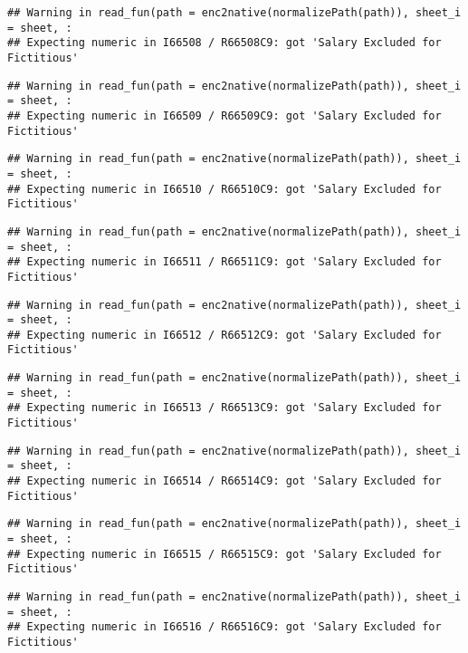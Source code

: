 \documentclass[
]{article}
\begin{document}
\begin{verbatim}
## Warning in read_fun(path = enc2native(normalizePath(path)), sheet_i = sheet, :
## Expecting numeric in I66508 / R66508C9: got 'Salary Excluded for Fictitious'
\end{verbatim}

\begin{verbatim}
## Warning in read_fun(path = enc2native(normalizePath(path)), sheet_i = sheet, :
## Expecting numeric in I66509 / R66509C9: got 'Salary Excluded for Fictitious'
\end{verbatim}

\begin{verbatim}
## Warning in read_fun(path = enc2native(normalizePath(path)), sheet_i = sheet, :
## Expecting numeric in I66510 / R66510C9: got 'Salary Excluded for Fictitious'
\end{verbatim}

\begin{verbatim}
## Warning in read_fun(path = enc2native(normalizePath(path)), sheet_i = sheet, :
## Expecting numeric in I66511 / R66511C9: got 'Salary Excluded for Fictitious'
\end{verbatim}

\begin{verbatim}
## Warning in read_fun(path = enc2native(normalizePath(path)), sheet_i = sheet, :
## Expecting numeric in I66512 / R66512C9: got 'Salary Excluded for Fictitious'
\end{verbatim}

\begin{verbatim}
## Warning in read_fun(path = enc2native(normalizePath(path)), sheet_i = sheet, :
## Expecting numeric in I66513 / R66513C9: got 'Salary Excluded for Fictitious'
\end{verbatim}

\begin{verbatim}
## Warning in read_fun(path = enc2native(normalizePath(path)), sheet_i = sheet, :
## Expecting numeric in I66514 / R66514C9: got 'Salary Excluded for Fictitious'
\end{verbatim}

\begin{verbatim}
## Warning in read_fun(path = enc2native(normalizePath(path)), sheet_i = sheet, :
## Expecting numeric in I66515 / R66515C9: got 'Salary Excluded for Fictitious'
\end{verbatim}

\begin{verbatim}
## Warning in read_fun(path = enc2native(normalizePath(path)), sheet_i = sheet, :
## Expecting numeric in I66516 / R66516C9: got 'Salary Excluded for Fictitious'
\end{verbatim}
\end{document}
